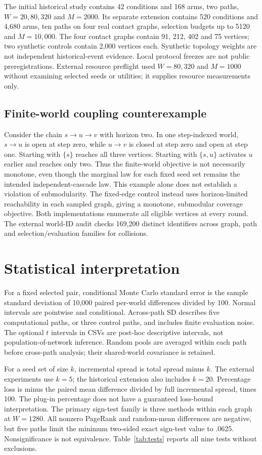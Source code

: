 \documentclass[smallextended]{svjour3}
\begin{document}
The initial historical study contains 42 conditions and 168 arms, two paths,
$W=20,80,320$ and $M=2000$. Its separate extension contains 520 conditions and
4,680 arms, ten paths on four real contact graphs, selection budgets up to 5120
and $M=10,000$. The four contact graphs contain 91, 212, 402 and 75 vertices;
two synthetic controls contain 2,000 vertices each. Synthetic topology weights
are not independent historical-event evidence. Local protocol freezes are not
public preregistrations. External resource preflight used $W=80,320$ and
$M=1000$ without examining selected seeds or utilities; it supplies resource
measurements only.

\subsection{Finite-world coupling counterexample}
Consider the chain $s\to u\to v$ with horizon two. In one step-indexed world,
$s\to u$ is open at step zero, while $u\to v$ is closed at step zero and open
at step one. Starting with $\{s\}$ reaches all three vertices. Starting with
$\{s,u\}$ activates $u$ earlier and reaches only two. Thus the finite-world
objective is not necessarily monotone, even though the marginal law for each
fixed seed set remains the intended independent-cascade law. This example alone
does not establish a violation of submodularity. The fixed-edge control instead
uses horizon-limited reachability in each sampled graph, giving a monotone,
submodular coverage objective. Both implementations enumerate all eligible
vertices at every round. The external world-ID audit checks 169,200 distinct
identifiers across graph, path and selection/evaluation families for collisions.

\section{Statistical interpretation}
For a fixed selected pair, conditional Monte Carlo standard error is the sample
standard deviation of 10,000 paired per-world differences divided by 100.
Normal intervals are pointwise and conditional. Across-path SD describes five
computational paths, or three control paths, and includes finite evaluation noise.
The optional $t$ intervals in CSVs are post-hoc descriptive intervals, not
population-of-network inference. Random pools are averaged within each path
before cross-path analysis; their shared-world covariance is retained.

For a seed set of size $k$, incremental spread is total spread minus $k$.
The external experiments use $k=5$; the historical extension also includes $k=20$.
Percentage loss is
minus the paired mean difference divided by full incremental spread, times 100.
The plug-in percentage does not have a guaranteed loss-bound interpretation.
The primary sign-test family is three methods within each graph at $W=1280$.
All nonzero PageRank and random-mean differences are negative, but five paths
limit the minimum two-sided exact sign-test value to .0625. Nonsignificance is
not equivalence. Table~\ref{tab:tests} reports all nine tests without exclusions.
\end{document}
